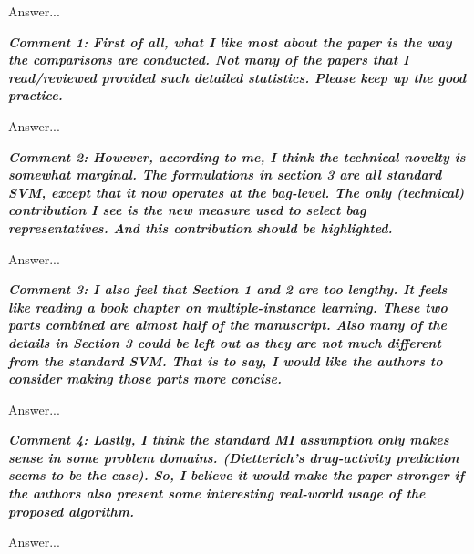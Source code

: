 \documentclass[a4paper,notitlepage]{article}
\begin{document}
\medskip

\noindent Answer...

\noindent \textbf{\textit{Comment 1: First of all, what I like most about the paper is the way the comparisons are conducted. Not many of the papers that I read/reviewed provided such detailed statistics. Please keep up the good practice. }}

\medskip

\noindent Answer...

\noindent \textbf{\textit{Comment 2: However, according to me, I think the technical novelty is somewhat marginal. 
The formulations in section 3 are all standard SVM, except that it now operates at the bag-level. The only (technical) contribution I see is the new measure used to select bag representatives. And this contribution should be highlighted. }}

\medskip

\noindent Answer...

\noindent \textbf{\textit{Comment 3: I also feel that Section 1 and 2 are too lengthy. It feels like reading a 
book chapter on multiple-instance learning. These two parts combined are almost half of the manuscript. Also many of the details in Section 3 could be left out as they are not much different from the standard SVM. That is to say, I would like the authors to consider making those parts more concise. }}

\medskip

\noindent Answer...

\noindent \textbf{\textit{Comment 4: Lastly, I think the standard MI assumption only makes sense in some problem domains. (Dietterich's drug-activity prediction seems to be the case). So, I believe it would make the paper stronger if the authors also present some interesting real-world usage of the proposed algorithm. }}

\medskip

\noindent Answer...
\end{document}
